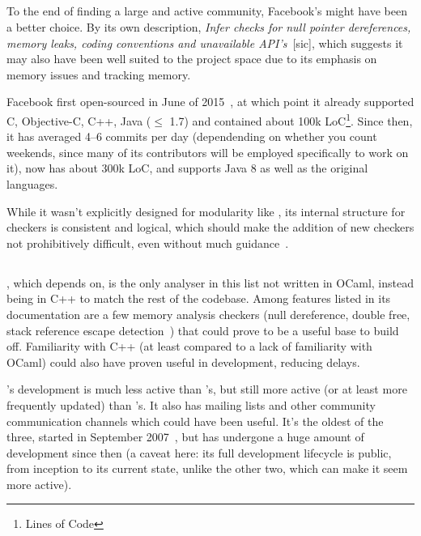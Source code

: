 \subsection{}

To the end of finding a large and active community, Facebook's  might have been a better choice. By its own description, \textit{Infer checks for null pointer dereferences, memory leaks, coding conventions and unavailable API’s}~[sic], which suggests it may also have been well suited to the project space due to its emphasis on memory issues and tracking memory.

Facebook first open-sourced  in June of 2015~\cite{infergit}, at which point it already supported C, Objective-C, C++, Java ($\le$ 1.7) and contained about 100k LoC\footnote{Lines of Code}. Since then, it has averaged 4–6 commits per day (dependending on whether you count weekends, since many of its contributors will be employed specifically to work on it), now has about 300k LoC, and supports Java 8 as well as the original languages.

While it wasn't explicitly designed for modularity like , its internal structure for checkers is consistent and logical, which should make the addition of new checkers not prohibitively difficult, even without much guidance~\cite{infercheckers}.

\subsection{}

, which  depends on, is the only analyser in this list not written in OCaml, instead being in C++ to match the rest of the  codebase. Among features listed in its documentation are a few memory analysis checkers (null dereference, double free, stack reference escape detection~\cite{clangchecks}) that could prove to be a useful base to build off. Familiarity with C++ (at least compared to a lack of familiarity with OCaml) could also have proven useful in development, reducing delays.

's development is much less active than 's, but still more active (or at least more frequently updated) than 's. It also has mailing lists and other community communication channels which could have been useful. It's the oldest of the three, started in September 2007~\cite{clangrelease}, but has undergone a huge amount of development since then (a caveat here: its full development lifecycle is public, from inception to its current state, unlike the other two, which can make it seem more active).


